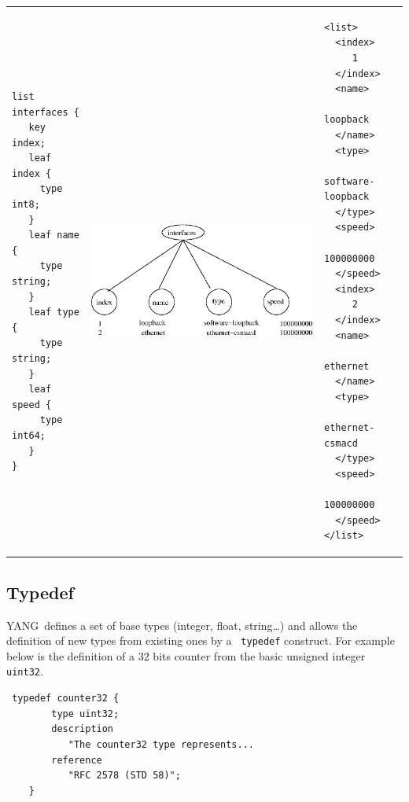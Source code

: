 \documentclass[a4paper]{article}
\newcommand{\y}{YANG}
\begin{document}
\noindent
\begin{tabular}{lcl}
\begin{minipage}{.25\textwidth}
\begin{verbatim}
list interfaces {
   key index;
   leaf index {
     type int8;
   }
   leaf name {
     type string;
   }
   leaf type {
     type string;
   }
   leaf speed {
     type int64;
   }
}
\end{verbatim}
\end{minipage}
&
\begin{minipage}{.55\textwidth}
\includegraphics[scale=.6]{listinterface.eps}
\end{minipage}
&
\begin{minipage}{.2\textwidth}
\begin{small}
\begin{verbatim}
<list>
  <index>
     1
  </index>
  <name>
     loopback
  </name>
  <type>
     software-loopback
  </type>
  <speed>
     100000000
  </speed>
  <index>
     2
  </index>
  <name>
     ethernet
  </name>
  <type>
     ethernet-csmacd
  </type>
  <speed>
     100000000
  </speed>
</list>
\end{verbatim}
\end{small}
\end{minipage}
\end{tabular}

\subsection{Typedef}

\y\ defines  a set  of base types  (integer, float,  string\ldots) and
allows  the definition  of  new types  from  existing ones  by a  {\tt
typedef} construct.  For example below  is the definition of a 32 bits
counter from the basic unsigned integer {\tt uint32}.

\begin{lstlisting}
 typedef counter32 {
        type uint32;
        description
           "The counter32 type represents...
        reference
           "RFC 2578 (STD 58)";
    }
\end{lstlisting}
\end{document}

